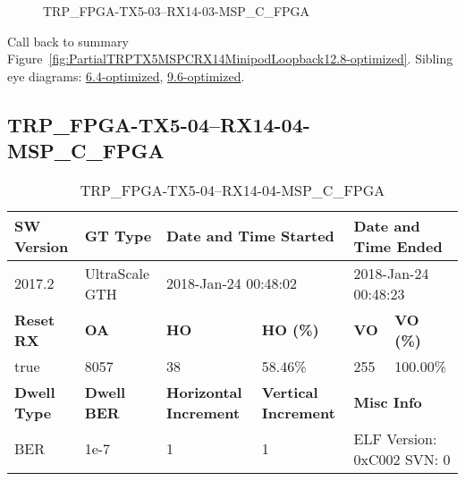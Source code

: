 \begin{figure}[h]
\caption{TRP\_FPGA-TX5-03--RX14-03-MSP\_C\_FPGA} \label{fig:TRPFPGATX503RX1403MSPCFPGA12.8-optimized}
\end{figure}

Call back to summary Figure~\ref{fig:PartialTRPTX5MSPCRX14MinipodLoopback12.8-optimized}.
Sibling eye diagrams: \hyperref[sec:TRPFPGATX503RX1403MSPCFPGA6.4-optimized]{6.4-optimized}, \hyperref[sec:TRPFPGATX503RX1403MSPCFPGA9.6-optimized]{9.6-optimized}.

\clearpage
\newpage


\subsection{TRP\_FPGA-TX5-04--RX14-04-MSP\_C\_FPGA}\label{sec:TRPFPGATX504RX1404MSPCFPGA12.8-optimized}

\begin{table}[h]
\centering
\caption{TRP\_FPGA-TX5-04--RX14-04-MSP\_C\_FPGA}
\label{tab:TRPFPGATX504RX1404MSPCFPGA12.8-optimized}
\begin{tabular}{@{}|l|l|l|l|l|l|@{}}
\toprule
\textbf{SW Version}                & \textbf{GT Type}   & \multicolumn{2}{l|}{\textbf{Date and Time Started}}            & \multicolumn{2}{l|}{\textbf{Date and Time Ended}}        \\ \midrule
2017.2                       & UltraScale GTH          & \multicolumn{2}{l|}{2018-Jan-24 00:48:02}                   & \multicolumn{2}{l|}{2018-Jan-24 00:48:23}               \\ \midrule
\textbf{Reset RX}                  & \textbf{OA} & \textbf{HO}   & \textbf{HO (\%)} & \textbf{VO} & \textbf{VO (\%)} \\ \midrule
true & 8057        & 38          & 58.46\%        & 255        & 100.00\%       \\ \midrule
\textbf{Dwell Type}                & \textbf{Dwell BER} & \textbf{Horizontal Increment} & \textbf{Vertical Increment}    & \multicolumn{2}{l|}{\textbf{Misc Info}}                  \\ \midrule
BER                            & 1e-7        & 1        & 1           & \multicolumn{2}{l|}{ELF Version: 0xC002 SVN: 0}                         \\ \bottomrule
\end{tabular}
\end{table}

